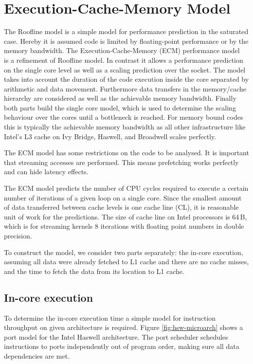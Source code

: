 \section{Execution-Cache-Memory Model}

The Roofline model is a simple model
for performance prediction in the saturated case.
Hereby it is assumed code is limited by floating-point performance or by the
memory bandwidth.
The Execution-Cache-Memory (ECM) performance model~\cite{treibig-2010-ecm,hager-2012-ecm} is a refinement
of Roofline model. 
In contrast it allows a performance prediction on the single core level as well
as a scaling prediction over the socket.
The model takes into account the duration of the code execution inside the core
separated by arithmetic and data movement.
Furthermore data transfers in the memory/cache hierarchy are considered as well
as the achievable memory bandwidth.
%
Finally both parts build the single core model, which is used to determine the
scaling behaviour over the cores until a bottleneck is reached. 
%
For memory bound codes this is typically the achievable memory bandwidth as all
other infrastructure like Intel's L3 cache on Ivy Bridge, Haswell, and Broadwell
scales perfectly. 

The ECM model has some restrictions on the code to be analysed.
It is important that streaming accesses are performed. This means prefetching
works perfectly and can hide latency effects.

The ECM model predicts the number of CPU cycles required to execute a certain number of iterations of a given loop on a single core. Since the smallest amount of data transferred between cache levels is one cache line (CL), it is reasonable unit of work for the predictions. The size of cache line on Intel processors is 64\,B, which is for streaming kernels 8 iterations with floating point numbers in double precision.

To construct the model, we consider two parts separately: the in-core execution, assuming all data were already fetched to L1 cache and there are no cache misses, and the time to fetch the data from its location to L1 cache.

\subsection*{In-core execution}

To determine the in-core execution time a simple model for instruction throughput on given architecture is required. Figure \ref{fig:hsw-microarch} shows a port model for the Intel Haswell architecture. The port scheduler schedules instructions to ports independently out of program order, making sure all data dependencies are met.

